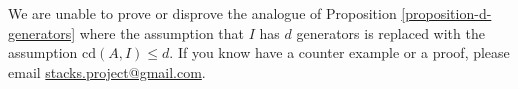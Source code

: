\begin{remark}
\label{remark-question}
We are unable to prove or disprove the analogue of
Proposition \ref{proposition-d-generators}
where the assumption that $I$ has $d$ generators
is replaced with the assumption $\text{cd}(A, I) \leq d$.
If you know have a counter example or a proof, please email
\href{mailto:stacks.project@gmail.com}{stacks.project@gmail.com}.
\end{remark}











